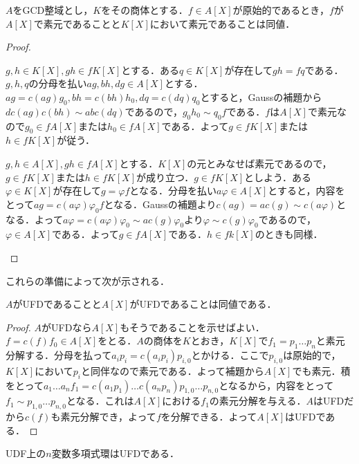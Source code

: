 \begin{lem}
	$A$をGCD整域とし，$K$をその商体とする．$f\in A[X]$が原始的であるとき，$f$が$A[X]$で素元であることと$K[X]$において素元であることは同値．
\end{lem}
\begin{proof}
	\begin{eqv}
		\item $g,h\in K[X], gh\in fK[X]$とする．ある$q\in K[X]$が存在して$gh=fq$である．$g,h,q$の分母を払い$ag,bh,dg\in A[X]$とする．$ag=c(ag)g_0,bh=c(bh)h_0,dq=c(dq)q_0$とすると，Gaussの補題から$d c(ag)c(bh)\sim ab c(dq)$であるので，$g_0h_0\sim q_0f$である．$f$は$A[X]$で素元なので$g_0\in fA[X]$または$h_0\in fA[X]$である．よって$g\in fK[X]$または$h\in fK[X]$が従う．
		
		\item $g,h\in A[X], gh\in fA[X]$とする．$K[X]$の元とみなせば素元であるので，$g\in fK[X]$または$h\in fK[X]$が成り立つ．$g\in fK[X]$としよう．ある$\varphi\in K[X]$が存在して$g=\varphi f$となる．分母を払い$a\varphi\in A[X]$とすると，内容をとって$ag=c(a\varphi)\varphi_0f$となる．Gaussの補題より$c(ag)=ac(g)\sim c(a\varphi)$となる．よって$a\varphi=c(a\varphi)\varphi_0\sim ac(g)\varphi_0$より$\varphi\sim c(g)\varphi_0$であるので，$\varphi\in A[X]$である．よって$g\in fA[X]$である．$h\in fk[X]$のときも同様．
	\end{eqv}
\end{proof}

これらの準備によって次が示される．

\begin{thm}
	$A$がUFDであることと$A[X]$がUFDであることは同値である．
\end{thm}

\begin{proof}
	$A$がUFDなら$A[X]$もそうであることを示せばよい．$f=c(f)f_0\in A[X]$をとる．$A$の商体を$K$とおき，$K[X]$で$f_1=p_1\dots p_n$と素元分解する．分母を払って$a_ip_i=c(a_ip_i)p_{i,0}$とかける．ここで$p_{i,0}$は原始的で，$K[X]$において$p_i$と同伴なので素元である．よって補題から$A[X]$でも素元．積をとって$a_1\dots a_n f_1=c(a_1p_1)\dots c(a_np_n)p_{1,0}\dots p_{n,0}$となるから，内容をとって$f_1\sim p_{1,0}\dots p_{n,0}$となる．これは$A[X]$における$f_1$の素元分解を与える．$A$はUFDだから$c(f)$も素元分解でき，よって$f$を分解できる．よって$A[X]$はUFDである．
\end{proof}

\begin{cor}\label{cor:多変数もUFD}
	UDF上の$n$変数多項式環はUFDである．
\end{cor}


